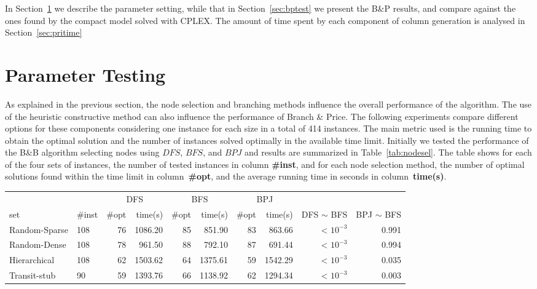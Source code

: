 In Section~\ref{sec:param} we describe the parameter setting, while that in Section~\ref{sec:bptest} we present the B\&P results, and compare against the ones found by the compact model solved with CPLEX. The amount of time spent by each component of column generation is analysed in Section~\ref{sec:pritime}

\section{Parameter Testing}
\label{sec:param}

As explained in the previous section, the node selection and branching methods influence the overall performance of the algorithm.
The use of the heuristic constructive method can also influence the performance of Branch \& Price.
The following experiments compare different options for these components considering one instance for each size in a total of 414 instances.
The main metric used is the running time to obtain the optimal solution and the number of instances solved optimally in the available time limit.
Initially we tested the performance of the B\&B algorithm selecting nodes using  $DFS$, $BFS$, and $BPJ$ and results are summarized in Table~\ref{tab:nodesel}. 
The table shows for each of the four sets of instances, the number of tested instances in column \textbf{\#inst}, and for each node selection method, the number of optimal solutions found within the time limit in column~\textbf{\#opt}, and the average running time in seconds in column~\textbf{time(s)}.

\begin{table*}[h]
\footnotesize
\begin{center}
  \caption{Node Selection Results}\label{tab:nodesel}
\begin{tabular} {l l | r r | r r | r r | r r }
\hline
                &                &  \multicolumn{2}{c|}{DFS}  & \multicolumn{2}{c|}{BFS}   & \multicolumn{2}{c|}{BPJ}  \\
  set           & \#inst           &  \#opt       & time(s)        & \#opt   & time(s)          & \#opt           & time(s)     & DFS $\sim$ BFS   & BPJ $\sim$ BFS  \\
 \hline 
 Random-Sparse  & 108            & 76         & 1086.20    & 85        & 851.90       & 83            & 863.66   & < $10^{-3}$         & 0.991          \\
 Random-Dense   & 108            & 78         & 961.50     & 88        & 792.10       & 87            & 691.44   & < $10^{-3}$         & 0.994          \\ 
 Hierarchical   & 108            & 62         & 1503.62    & 64        & 1375.61      & 59            & 1542.29  & < $10^{-3}$         & 0.035          \\
 Transit-stub   & 90             & 59         & 1393.76    & 66        & 1138.92      & 62            & 1294.34  & < $10^{-3}$         & 0.003          \\
\hline
\end{tabular}\caption*{Source: from author (2015).}
\end{center}
\end{table*}

